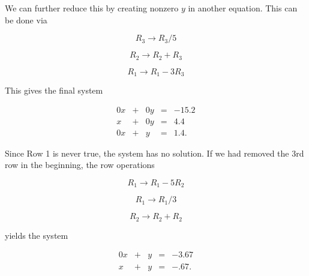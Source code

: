 \documentclass{ximera}
\begin{document}
\begin{exploration}
\begin{example}
\begin{solution}
            We can further reduce this by creating nonzero $y$ in another equation. This can be done via
    
            $$R_3\rightarrow R_3/5$$
    
            $$R_2\rightarrow R_2+R_3$$
    
            $$R_1\rightarrow R_1-3R_3$$
    
            This gives the final system
    
            $$\begin{array}{ccccc}
                    0x & +&0y&=&-15.2 \\
                    x& +&0y&=&4.4 \\
                    0x& +&y&=&1.4.
                \end{array}$$
    
            Since Row 1 is never true, the system has no solution. If we had removed the 3rd row in the beginning, the row operations 
    
            $$R_1\rightarrow R_1-5R_2$$
    
            $$R_1\rightarrow R_1/3$$
    
            $$R_2\rightarrow R_2+R_2$$
    
            yields the system
    
            $$\begin{array}{ccccc}
                    0x & +&y&=&-3.67 \\
                    x& +&y&=&-.67.
                \end{array}$$
    
        \end{solution}
    
    \end{example}

  \end{exploration}
\end{document}
